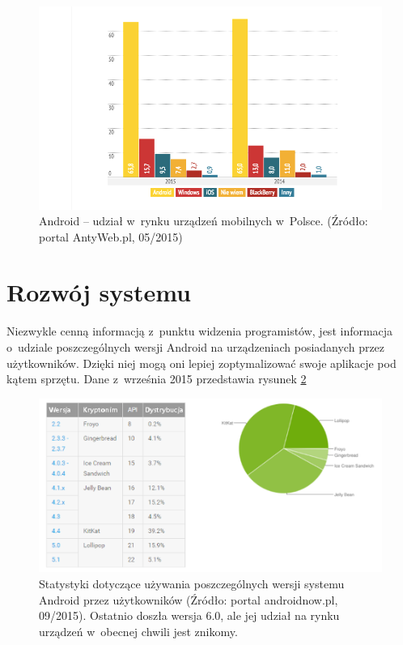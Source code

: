 \begin{figure}[!htb]
    \centering
    \includegraphics[width=15cm]{imgs/ch2_android_udzial_1.png}
    \caption
{Android – udział w~rynku urządzeń mobilnych w~Polsce. (Źródło: portal AntyWeb.pl, 05/2015)}
    \label{fig:android_udzial_polska}
\end{figure} 

\newpage

\section{Rozwój systemu}
Niezwykle cenną informacją z~punktu widzenia programistów, jest informacja o~udziale poszczególnych wersji Android na urządzeniach posiadanych przez użytkowników. Dzięki niej mogą oni lepiej zoptymalizować swoje aplikacje pod kątem sprzętu. Dane z~września 2015 przedstawia rysunek \ref{fig:android_udzial_wersje}

\begin{figure}[!htb]
    \centering
    \includegraphics[width=17cm]{imgs/ch2_android_udzial_3pl.png}
    \caption
{Statystyki dotyczące używania poszczególnych wersji systemu Android przez użytkowników (Źródło: portal androidnow.pl, 09/2015). Ostatnio doszła wersja 6.0, ale jej udział na rynku urządzeń w~obecnej chwili jest znikomy.}
    \label{fig:android_udzial_wersje}
\end{figure} 

